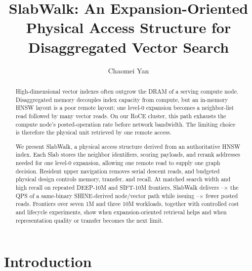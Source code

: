 \documentclass[sigconf,nonacm]{acmart}
\newcommand{\sys}{SlabWalk}
\begin{document}
\raggedbottom

\title[\sys: Expansion-Oriented Access Structure]{\sys: An Expansion-Oriented Physical Access Structure for Disaggregated Vector Search}

\author{Chaomei Yan}

\begin{abstract}
High-dimensional vector indexes often outgrow the DRAM of a serving compute
node.  Disaggregated memory decouples index capacity from compute, but an
in-memory HNSW layout is a poor remote layout: one level-0 expansion becomes a
neighbor-list read followed by many vector reads.  On our RoCE cluster, this
path exhausts the compute node's posted-operation rate before network
bandwidth.  The limiting choice is therefore the physical unit retrieved by
one remote access.

We present \sys{}, a physical access structure derived from an authoritative
HNSW index.  Each Slab stores the neighbor identifiers, scoring payloads, and
rerank addresses needed for one level-0 expansion, allowing one remote read to
supply one graph decision.  Resident upper navigation removes serial descent
reads, and budgeted physical design controls memory, transfer, and recall.  At
matched search width and high recall on repeated DEEP-10M and SIFT-10M
frontiers, \sys{} delivers \ClaimFrontierQpsMin--\ClaimFrontierQpsMax$\times$
the QPS of a same-binary SHINE-derived node/vector path while issuing
\ClaimFrontierPostsMin--\ClaimFrontierPostsMax$\times$ fewer posted reads.
Frontiers over seven 1M and three 10M workloads, together with controlled cost
and lifecycle experiments, show when expansion-oriented retrieval helps and
when representation quality or transfer becomes the next limit.
\end{abstract}

\maketitle

\vldbtopmatter

\section{Introduction}
\label{sec:intro}
\end{document}

